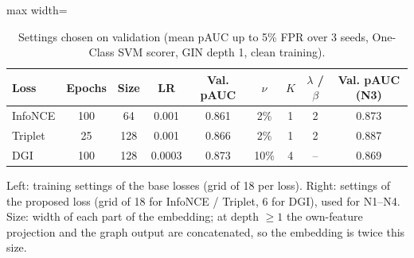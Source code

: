 \begin{table}[htbp]
\centering
\small
\caption{Settings chosen on validation (mean pAUC up to 5\% FPR over 3 seeds, One-Class SVM scorer, GIN depth 1, clean training).}
\label{tab:settings}
\begin{adjustbox}{max width=\linewidth}
\begin{tabular}{lcccccccc}
\toprule
Loss & Epochs & Size & LR & Val. pAUC & $\nu$ & $K$ & $\lambda$ / $\beta$ & Val. pAUC (N3) \\
\midrule
InfoNCE & 100 & 64 & 0.001 & 0.861 & 2\% & 1 & 2 & 0.873 \\
Triplet & 25 & 128 & 0.001 & 0.866 & 2\% & 1 & 2 & 0.887 \\
DGI & 100 & 128 & 0.0003 & 0.873 & 10\% & 4 & -- & 0.869 \\
\bottomrule
\end{tabular}
\end{adjustbox}
\par\smallskip
\parbox{0.95\linewidth}{\footnotesize Left: training settings of the base losses (grid of 18 per loss). Right: settings of the proposed loss (grid of 18 for InfoNCE / Triplet, 6 for DGI), used for N1--N4. Size: width of each part of the embedding; at depth $\geq 1$ the own-feature projection and the graph output are concatenated, so the embedding is twice this size.}
\end{table}

